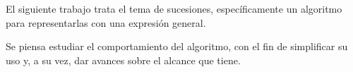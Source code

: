 
El siguiente trabajo trata el tema de sucesiones, específicamente un algoritmo para representarlas con una expresión general.

Se piensa estudiar el comportamiento del algoritmo, con el fin de simplificar su uso y, a su vez, dar avances sobre el alcance que tiene.